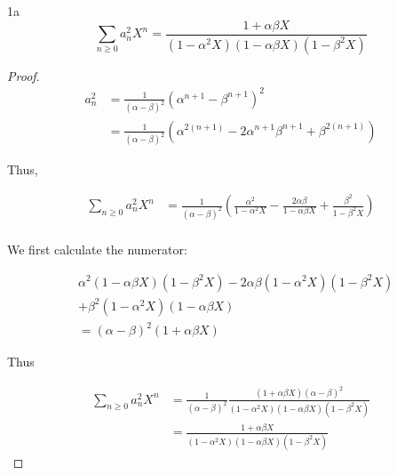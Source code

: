 \documentclass{article}
\begin{document}
\begin{claim}{1a}\label{Claim 1a.}
    \[\sum_{n \geq 0} a_n^2 X^n = \frac{1 + \alpha \beta X}{(1 - \alpha^2 X)(1 - \alpha \beta X)(1 - \beta^2 X)}\]
\end{claim}
\begin{proof}
    \begin{align*}
        a_n^2 &= \frac{1}{(\alpha - \beta)^2}(\alpha^{n + 1} - \beta^{n + 1})^2 \\
        &= \frac{1}{(\alpha - \beta)^2}(\alpha^{2(n + 1)} - 2\alpha^{n + 1}\beta^{n + 1} + \beta^{2(n + 1)})
    \end{align*}

    Thus,

    \begin{align*}
        \sum_{n \geq 0} a_n^2 X^n &= \frac{1}{(\alpha - \beta)^2}\left(\frac{\alpha^2}{1 - \alpha^2 X} - \frac{2\alpha \beta}{1 - \alpha \beta X} + \frac{\beta^2}{1 - \beta^2 X}\right) \\
    \end{align*}

    We first calculate the numerator:

    \begin{align*}
        &\alpha^2(1 - \alpha \beta X)(1 - \beta^2 X) - 2 \alpha \beta (1 - \alpha^2 X)(1 - \beta^2 X)\\ &+ \beta^2(1 - \alpha^2 X)(1 - \alpha \beta X)\\
        &= (\alpha - \beta)^2(1 + \alpha \beta X)
    \end{align*}

    Thus 

    \begin{align*}
        \sum_{n \geq 0} a_n^2 X^n &= \frac{1}{(\alpha - \beta)^2} \frac{(1 + \alpha \beta X)(\alpha - \beta)^2}{(1 - \alpha^2 X)(1 - \alpha \beta X)(1 - \beta^2 X)} \\ 
        &= \frac{1 + \alpha \beta X}{(1 - \alpha^2 X)(1 - \alpha \beta X)(1 - \beta^2 X)}
    \end{align*}
\end{proof}
\end{document}
